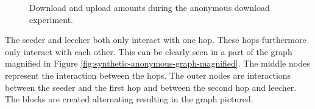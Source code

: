 \begin{figure}
\centering
{}
\caption{Download and upload amounts during the anonymous download experiment.}
\label{fig:synthetic-anonymous-amounts}
\end{figure}

The seeder and leecher both only interact with one hop.
These hops furthermore only interact with each other.
This can be clearly seen in a part of the graph magnified in Figure \ref{fig:synthetic-anonymous-graph-magnified}.
The middle nodes represent the interaction between the hops.
The outer nodes are interactions between the seeder and the first hop and between the second hop and leecher.
The blocks are created alternating resulting in the graph pictured.

